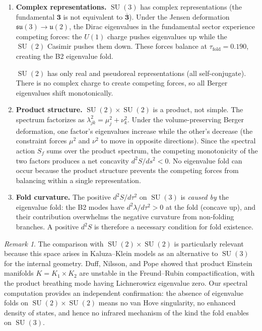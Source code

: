 \documentclass[12pt]{article}
\theoremstyle{definition}
\theoremstyle{remark}
\newtheorem{remark}[theorem]{Remark}
\DeclareMathOperator{\SU}{SU}
\begin{document}
\begin{enumerate}
\item \textbf{Complex representations.}  $\SU(3)$ has complex
  representations (the fundamental $\mathbf{3}$ is not equivalent to
  $\overline{\mathbf{3}}$).  Under the Jensen deformation
  $\mathfrak{su}(3) \to \mathfrak{u}(2)$, the Dirac eigenvalues in
  the fundamental sector experience competing forces: the $U(1)$
  charge pushes eigenvalues up while the $\SU(2)$ Casimir pushes them
  down.  These forces balance at $\tau_{\mathrm{fold}} = 0.190$,
  creating the B2 eigenvalue fold.

  $\SU(2)$ has only real and pseudoreal representations (all
  self-conjugate).  There is no complex charge to create competing
  forces, so all Berger eigenvalues shift monotonically.

\item \textbf{Product structure.}  $\SU(2) \times \SU(2)$ is a
  product, not simple.  The spectrum factorizes as
  $\lambda_{jk}^2 = \mu_j^2 + \nu_k^2$.  Under the volume-preserving
  Berger deformation, one factor's eigenvalues increase while the
  other's decrease (the constraint forces $\mu^2$ and $\nu^2$ to move
  in opposite directions).  Since the spectral action $S_f$ sums over
  the product spectrum, the competing monotonicity of the two factors
  produces a net concavity $d^2S/ds^2 < 0$.  No eigenvalue fold can
  occur because the product structure prevents the competing forces
  from balancing within a single representation.

\item \textbf{Fold curvature.}  The positive $d^2S/d\tau^2$ on
  $\SU(3)$ is \emph{caused by} the eigenvalue fold: the B2 modes
  have $d^2\lambda/d\tau^2 > 0$ at the fold (concave up), and their
  contribution overwhelms the negative curvature from non-folding
  branches.  A positive $d^2S$ is therefore a necessary condition for
  fold existence.
\end{enumerate}

\begin{remark}
The comparison with $\SU(2) \times \SU(2)$ is particularly relevant
because this space arises in Kaluza--Klein models as an alternative
to $\SU(3)$ for the internal geometry.  Duff, Nilsson, and Pope
\cite{DuffNilssonPope} showed that product Einstein
manifolds $K = K_1 \times K_2$ are unstable in the Freund--Rubin
compactification, with the product breathing mode having Lichnerowicz
eigenvalue zero.  Our spectral computation provides an independent
confirmation: the absence of eigenvalue folds on
$\SU(2) \times \SU(2)$ means no van Hove singularity, no enhanced
density of states, and hence no infrared mechanism of the kind the
fold enables on $\SU(3)$.
\end{remark}
\end{document}
